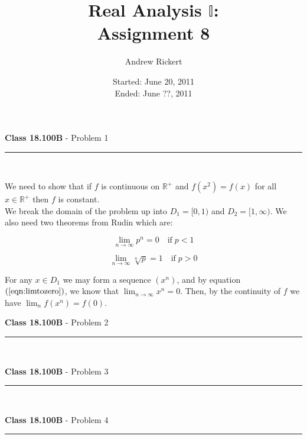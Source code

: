 \documentclass[11pt,reqno]{article}
\title{Real Analysis $\mathbb{I}$: \\ Assignment 8}
\author{Andrew Rickert}
\date{Started: June 20, 2011 \\ \hspace{1pt} Ended: June ??,  2011}                                           %
\begin{document}
\maketitle


\begin{flushleft} 
\textbf{Class 18.100B} - Problem 1\\
\rule{500pt}{1pt}\\
\end{flushleft} 

We need to show that if $f$ is continuous on $\mathbb{R}^+$ and $f(x^2) = f(x)$ for all $x \in \mathbb{R}^+$ then $f$ is constant.\\
\indent We break the domain of the problem up into $D_1 = [0,1)$ and $D_2 = [1,\infty)$. We also need two theorems from Rudin which are:


\begin{equation}
\lim_{n \to \infty} p^n = 0 \quad \text{if} \; p < 1 \label{eqn:limtozero}
\end{equation}

\begin{equation}
\lim_{n \to \infty} \sqrt[n]{p} = 1 \quad \text{if} \; p > 0 \label{eqn:limtoone}
\end{equation}


For any $x \in D_1$ we may form a sequence $(x^n)$, and by equation $(\ref{eqn:limtozero})$, we know that $\lim_{n \to \infty} x^n = 0$. Then, by the continuity of $f$ we have $\lim_n f(x^n) = f(0)$.

\vspace{15pt}
\begin{flushleft} 
\textbf{Class 18.100B} - Problem 2\\
\rule{500pt}{1pt}\\
\end{flushleft} 


\vspace{15pt}
\begin{flushleft} 
\textbf{Class 18.100B} - Problem 3\\
\rule{500pt}{1pt}\\
\end{flushleft} 



\vspace{15pt}
\begin{flushleft} 
\textbf{Class 18.100B} - Problem 4\\
\rule{500pt}{1pt}\\
\end{flushleft} 
\end{document}
